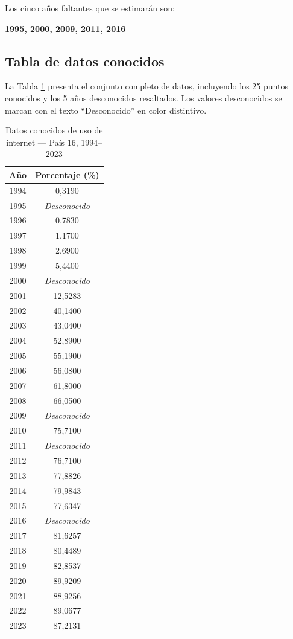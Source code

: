 \documentclass[12pt, letterpaper]{article}
\begin{document}
Los cinco años faltantes que se estimarán son:
\begin{center}
\textbf{1995, 2000, 2009, 2011, 2016}
\end{center}

\subsection{Tabla de datos conocidos}\label{subsec:tabla-datos}

La Tabla \ref{tab:datos-conocidos} presenta el conjunto completo de datos, incluyendo los 25 puntos conocidos y los 5 años desconocidos resaltados. Los valores desconocidos se marcan con el texto ``Desconocido'' en color distintivo.

\begin{table}[H]
\centering
\caption{Datos conocidos de uso de internet --- País 16, 1994--2023}
\label{tab:datos-conocidos}
\small
\begin{tabular}{@{}cc@{}}
\toprule
\textbf{Año} & \textbf{Porcentaje (\%)} \\
\midrule
1994 & 0,3190 \\
1995 & \textcolor{missingcolor}{\textit{Desconocido}} \\
1996 & 0,7830 \\
1997 & 1,1700 \\
1998 & 2,6900 \\
1999 & 5,4400 \\
2000 & \textcolor{missingcolor}{\textit{Desconocido}} \\
2001 & 12,5283 \\
2002 & 40,1400 \\
2003 & 43,0400 \\
2004 & 52,8900 \\
2005 & 55,1900 \\
2006 & 56,0800 \\
2007 & 61,8000 \\
2008 & 66,0500 \\
2009 & \textcolor{missingcolor}{\textit{Desconocido}} \\
2010 & 75,7100 \\
2011 & \textcolor{missingcolor}{\textit{Desconocido}} \\
2012 & 76,7100 \\
2013 & 77,8826 \\
2014 & 79,9843 \\
2015 & 77,6347 \\
2016 & \textcolor{missingcolor}{\textit{Desconocido}} \\
2017 & 81,6257 \\
2018 & 80,4489 \\
2019 & 82,8537 \\
2020 & 89,9209 \\
2021 & 88,9256 \\
2022 & 89,0677 \\
2023 & 87,2131 \\
\bottomrule
\end{tabular}
\end{table}
\end{document}

